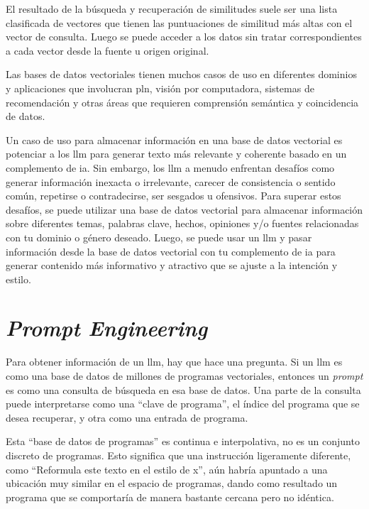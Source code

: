 
El resultado de la búsqueda y recuperación de similitudes suele ser una lista clasificada de vectores que tienen las puntuaciones de similitud más altas con el vector de consulta. Luego se puede acceder a los datos sin tratar correspondientes a cada vector desde la fuente u origen original.

Las bases de datos vectoriales tienen muchos casos de uso en diferentes dominios y aplicaciones que involucran \acrlong{pln}, visión por computadora, sistemas de recomendación y otras áreas que requieren comprensión semántica y coincidencia de datos.

Un caso de uso para almacenar información en una base de datos vectorial es potenciar a los \acrlong{llm} para generar texto más relevante y coherente basado en un complemento de \acrlong{ia}. Sin embargo, los \acrshort{llm} a menudo enfrentan desafíos como generar información inexacta o irrelevante, carecer de consistencia o sentido común, repetirse o contradecirse, ser sesgados u ofensivos. Para superar estos desafíos, se puede utilizar una base de datos vectorial para almacenar información sobre diferentes temas, palabras clave, hechos, opiniones y/o fuentes relacionadas con tu dominio o género deseado. Luego, se puede usar un \acrlong{llm} y pasar información desde la base de datos vectorial con tu complemento de \acrlong{ia} para generar contenido más informativo y atractivo que se ajuste a la intención y estilo.

\section{\textit{Prompt Engineering}}

Para obtener información de un \acrshort{llm}, hay que hace una pregunta. Si un \acrshort{llm} es como una base de datos de millones de programas vectoriales, entonces un \textit{prompt} es como una consulta de búsqueda en esa base de datos. Una parte de la consulta puede interpretarse como una ``clave de programa'', el índice del programa que se desea recuperar, y otra como una entrada de programa.

Esta ``base de datos de programas'' es continua e interpolativa, no es un conjunto discreto de programas. Esto significa que una instrucción ligeramente diferente, como ``Reformula este texto en el estilo de x'', aún habría apuntado a una ubicación muy similar en el espacio de programas, dando como resultado un programa que se comportaría de manera bastante cercana pero no idéntica.

